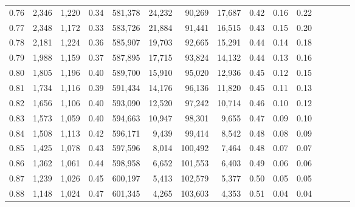 \begin{tabular}{rrrcrrrrrrrrrrr}
0.76 &   2,346 &  1,220 &                                       0.34 &  581,378 &   24,232 &   90,269 &   17,687 &  0.42 &  0.16 &                         0.22 \\
0.77 &   2,348 &  1,172 &                                       0.33 &  583,726 &   21,884 &   91,441 &   16,515 &  0.43 &  0.15 &                         0.20 \\
0.78 &   2,181 &  1,224 &                                       0.36 &  585,907 &   19,703 &   92,665 &   15,291 &  0.44 &  0.14 &                         0.18 \\
0.79 &   1,988 &  1,159 &                                       0.37 &  587,895 &   17,715 &   93,824 &   14,132 &  0.44 &  0.13 &                         0.16 \\
0.80 &   1,805 &  1,196 &                                       0.40 &  589,700 &   15,910 &   95,020 &   12,936 &  0.45 &  0.12 &                         0.15 \\
0.81 &   1,734 &  1,116 &                                       0.39 &  591,434 &   14,176 &   96,136 &   11,820 &  0.45 &  0.11 &                         0.13 \\
0.82 &   1,656 &  1,106 &                                       0.40 &  593,090 &   12,520 &   97,242 &   10,714 &  0.46 &  0.10 &                         0.12 \\
0.83 &   1,573 &  1,059 &                                       0.40 &  594,663 &   10,947 &   98,301 &    9,655 &  0.47 &  0.09 &                         0.10 \\
0.84 &   1,508 &  1,113 &                                       0.42 &  596,171 &    9,439 &   99,414 &    8,542 &  0.48 &  0.08 &                         0.09 \\
0.85 &   1,425 &  1,078 &                                       0.43 &  597,596 &    8,014 &  100,492 &    7,464 &  0.48 &  0.07 &                         0.07 \\
0.86 &   1,362 &  1,061 &                                       0.44 &  598,958 &    6,652 &  101,553 &    6,403 &  0.49 &  0.06 &                         0.06 \\
0.87 &   1,239 &  1,026 &                                       0.45 &  600,197 &    5,413 &  102,579 &    5,377 &  0.50 &  0.05 &                         0.05 \\
0.88 &   1,148 &  1,024 &                                       0.47 &  601,345 &    4,265 &  103,603 &    4,353 &  0.51 &  0.04 &                         0.04 \\

\end{tabular}
